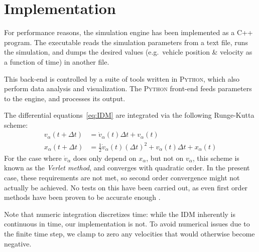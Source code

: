 \section{Implementation}
For performance reasons, the simulation engine has been implemented as a \textsc{C++} program. The executable reads the simulation parameters from a text file, runs the simulation, and dumps the desired values (e.g.\ vehicle position \& velocity as a function of time) in another file.

This back-end is controlled by a suite of tools written in \textsc{Python}, which also perform data analysis and visualization. The \textsc{Python} front-end feeds parameters to the engine, and processes its output.

\noindent The differential equations~\eqref{eq:IDM} are integrated via the following Runge-Kutta scheme:
\begin{align*}
v_\alpha(t+\Delta t) &= \dot v_\alpha(t)\Delta t+v_\alpha(t) \\
x_\alpha(t+\Delta t) &= \frac{1}{2}\dot v_\alpha(t) (\Delta t)^2 + v_\alpha(t)\Delta t + x_\alpha(t)
\end{align*}
For the case where $\dot v_\alpha$ does only depend on $x_\alpha$, but not on $v_\alpha$, this scheme is known as the \emph{Verlet method}, and converges with quadratic order. In the present case, these requirements are not met, so second order convergence might not actually be achieved. No tests on this have been carried out, as even first order methods have been proven to be accurate enough \cite{treiber2015}.

Note that numeric integration discretizes time: while the IDM inherently is continuous in time, our implementation is not. To avoid numerical issues due to the finite time step, we clamp to zero any velocities that would otherwise become negative.
